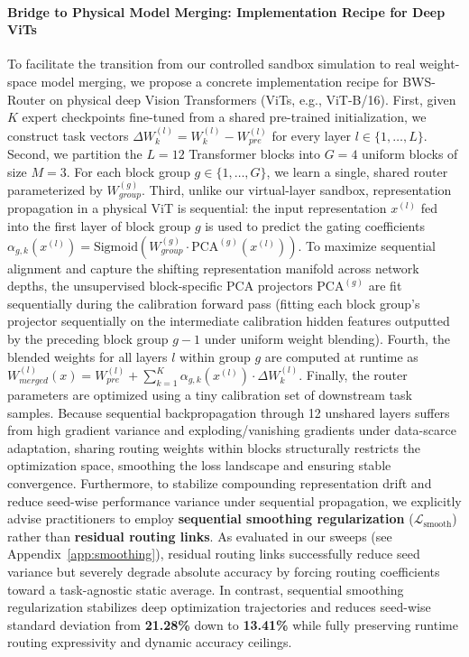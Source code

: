 \paragraph{Bridge to Physical Model Merging: Implementation Recipe for Deep ViTs}
To facilitate the transition from our controlled sandbox simulation to real weight-space model merging, we propose a concrete implementation recipe for BWS-Router on physical deep Vision Transformers (ViTs, e.g., ViT-B/16). 
First, given $K$ expert checkpoints fine-tuned from a shared pre-trained initialization, we construct task vectors $\Delta W_k^{(l)} = W_k^{(l)} - W_{pre}^{(l)}$ for every layer $l \in \{1, \dots, L\}$. 
Second, we partition the $L = 12$ Transformer blocks into $G = 4$ uniform blocks of size $M = 3$. For each block group $g \in \{1, \dots, G\}$, we learn a single, shared router parameterized by $W_{group}^{(g)}$. 
Third, unlike our virtual-layer sandbox, representation propagation in a physical ViT is sequential: the input representation $x^{(l)}$ fed into the first layer of block group $g$ is used to predict the gating coefficients $\alpha_{g, k}(x^{(l)}) = \text{Sigmoid}(W_{group}^{(g)} \cdot \text{PCA}^{(g)}(x^{(l)}))$. To maximize sequential alignment and capture the shifting representation manifold across network depths, the unsupervised block-specific PCA projectors $\text{PCA}^{(g)}$ are fit sequentially during the calibration forward pass (fitting each block group's projector sequentially on the intermediate calibration hidden features outputted by the preceding block group $g-1$ under uniform weight blending).
Fourth, the blended weights for all layers $l$ within group $g$ are computed at runtime as $W^{(l)}_{merged}(x) = W_{pre}^{(l)} + \sum_{k=1}^K \alpha_{g, k}(x^{(l)}) \cdot \Delta W_k^{(l)}$.
Finally, the router parameters are optimized using a tiny calibration set of downstream task samples. Because sequential backpropagation through 12 unshared layers suffers from high gradient variance and exploding/vanishing gradients under data-scarce adaptation, sharing routing weights within blocks structurally restricts the optimization space, smoothing the loss landscape and ensuring stable convergence. Furthermore, to stabilize compounding representation drift and reduce seed-wise performance variance under sequential propagation, we explicitly advise practitioners to employ \textbf{sequential smoothing regularization} ($\mathcal{L}_{\text{smooth}}$) rather than \textbf{residual routing links}. As evaluated in our sweeps (see Appendix~\ref{app:smoothing}), residual routing links successfully reduce seed variance but severely degrade absolute accuracy by forcing routing coefficients toward a task-agnostic static average. In contrast, sequential smoothing regularization stabilizes deep optimization trajectories and reduces seed-wise standard deviation from \textbf{21.28\%} down to \textbf{13.41\%} while fully preserving runtime routing expressivity and dynamic accuracy ceilings.

